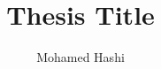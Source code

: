 \title{Thesis Title}
\author{Mohamed Hashi}
\newcommand{\firstName}  {Mohamed} 
\newcommand{\lastName}   {Hashi} 
\newcommand{\studId}     {1408593} 
\newcommand{\email}    {maxamedhashi@gmail.com} 
\newcommand{\uni} {Universiteit Leiden}

\setlength\parindent{0pt}
\setlength{\parskip}{2.5mm}